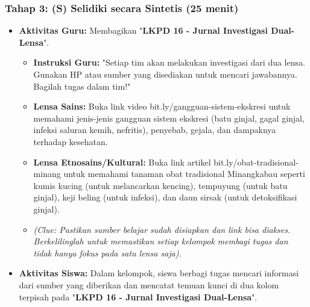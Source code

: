 \documentclass[a4paper,12pt]{article}
\begin{document}
\subsubsection{Tahap 3: (S) Selidiki secara Sintetis (25 menit)}
\begin{itemize}
\item \textbf{Aktivitas Guru:} Membagikan "\textbf{LKPD 16 - Jurnal Investigasi Dual-Lensa}".
    \begin{itemize}
    \item \textbf{Instruksi Guru:} "Setiap tim akan melakukan investigasi dari dua lensa. Gunakan HP atau sumber yang disediakan untuk mencari jawabannya. Bagilah tugas dalam tim!"
    \item \textbf{Lensa Sains:} Buka link video bit.ly/gangguan-sistem-ekskresi untuk memahami jenis-jenis gangguan sistem ekskresi (batu ginjal, gagal ginjal, infeksi saluran kemih, nefritis), penyebab, gejala, dan dampaknya terhadap kesehatan.
    \item \textbf{Lensa Etnosains/Kultural:} Buka link artikel bit.ly/obat-tradisional-minang untuk memahami tanaman obat tradisional Minangkabau seperti kumis kucing (untuk melancarkan kencing), tempuyung (untuk batu ginjal), keji beling (untuk infeksi), dan daun sirsak (untuk detoksifikasi ginjal).
    \item \textit{(Clue: Pastikan sumber belajar sudah disiapkan dan link bisa diakses. Berkelilinglah untuk memastikan setiap kelompok membagi tugas dan tidak hanya fokus pada satu lensa saja).}
    \end{itemize}
\item \textbf{Aktivitas Siswa:} Dalam kelompok, siswa berbagi tugas mencari informasi dari sumber yang diberikan dan mencatat temuan kunci di dua kolom terpisah pada "\textbf{LKPD 16 - Jurnal Investigasi Dual-Lensa}".
\end{itemize}
\end{document}
